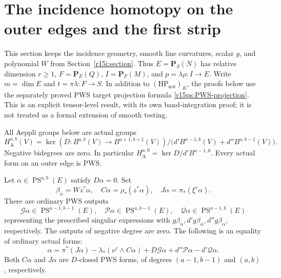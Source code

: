 \section{The incidence homotopy on the outer edges and the first strip}
\label{r15s:section}

This section keeps the incidence geometry, smooth line curvatures,
scalar $g$, and polynomial $W$ from
Section~\ref{r15i:section}.  Thus $E=\mathbf P_S(N)$ has
relative dimension $r\geq1$, $F=\mathbf P_E(Q)$,
$I=\mathbf P_F(M)$, and $p=\lambda\rho:I\to E$.
Write $m=\dim E$ and $t=\pi\lambda:F\to S$.
In addition to $(\mathrm{HP}_{\mathrm{nat}})_K$, the proofs
below use the separately proved PWS target projection formula
\eqref{r15ps:PWS-projection}.  This is an explicit
tensor-level result, with its own band-integration proof;
it is not treated as a formal extension of smooth testing.

All Aeppli groups below are actual groups
\[
 H_{\mathrm A}^{a,b}(V)
 =\ker(D:B^{a,b}(V)\to B^{a+1,b+1}(V))
     /\bigl(d'B^{a-1,b}(V)+d''B^{a,b-1}(V)\bigr).
\]
Negative bidegrees are zero.  In particular
$H_{\mathrm A}^{a,0}=\ker D/d'B^{a-1,0}$.
Every actual form on an outer edge is PWS.

\begin{lemma}
\label{r15s:general-homotopy}
Let $\alpha\in\operatorname{PS}^{a,b}(E)$ satisfy $D\alpha=0$.
Set
\[
 \beta_\alpha=Wz^*\alpha,
 \quad C\alpha=\rho_*(z^*\alpha),
 \quad J\alpha=\pi_*(\xi^r\alpha).
\tag{FS15.1}\label{r15s:CJ}
\]
There are ordinary PWS outputs
\[
 \mathcal G\alpha\in\operatorname{PS}^{a-1,b-1}(E),\quad
 \mathcal P\alpha\in\operatorname{PS}^{a,b-1}(E),\quad
 \mathcal Q\alpha\in\operatorname{PS}^{a-1,b}(E)
\tag{FS15.2}\label{r15s:degrees}
\]
representing the prescribed singular expressions with
$g\beta_\alpha,d'g\beta_\alpha,d''g\beta_\alpha$,
respectively.  The outputs of negative degree are zero.
The following is an equality of ordinary actual forms:
\[
 \alpha=\pi^*(J\alpha)
        -\lambda_*(\nu^r\wedge C\alpha)
        +D\mathcal G\alpha+d''\mathcal P\alpha
                                      -d'\mathcal Q\alpha.
\tag{FS15.3}\label{r15s:homotopy}
\]
Both $C\alpha$ and $J\alpha$ are $D$-closed PWS forms,
of degrees $(a-1,b-1)$ and $(a,b)$, respectively.
\end{lemma}

